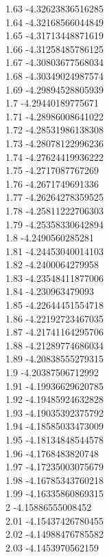 {1.63	-4.32623836516285\\
1.64	-4.32168566044849\\
1.65	-4.31713448871619\\
1.66	-4.31258485786125\\
1.67	-4.30803677568034\\
1.68	-4.30349024987574\\
1.69	-4.29894528805939\\
1.7	-4.29440189775671\\
1.71	-4.28986008641022\\
1.72	-4.28531986138308\\
1.73	-4.28078122996236\\
1.74	-4.27624419936222\\
1.75	-4.2717087767269\\
1.76	-4.2671749691336\\
1.77	-4.26264278359525\\
1.78	-4.25811222706303\\
1.79	-4.25358330642894\\
1.8	-4.2490560285281\\
1.81	-4.24453040014103\\
1.82	-4.2400064279958\\
1.83	-4.23548411877006\\
1.84	-4.230963479093\\
1.85	-4.22644451554718\\
1.86	-4.22192723467035\\
1.87	-4.21741164295706\\
1.88	-4.21289774686034\\
1.89	-4.20838555279315\\
1.9	-4.20387506712992\\
1.91	-4.19936629620785\\
1.92	-4.19485924632828\\
1.93	-4.19035392375792\\
1.94	-4.18585033473009\\
1.95	-4.18134848544578\\
1.96	-4.1768483820748\\
1.97	-4.17235003075679\\
1.98	-4.16785343760218\\
1.99	-4.16335860869315\\
2	-4.15886555008452\\
2.01	-4.15437426780455\\
2.02	-4.14988476785582\\
2.03	-4.1453970562159\\
}
